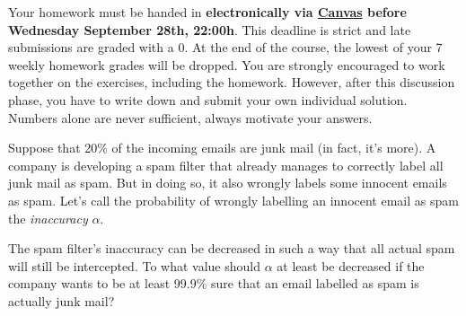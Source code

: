 \documentclass[a4paper,10pt,landscape,twocolumn]{scrartcl}
\newcommand\deadline{Wednesday September 28th, 22:00h}
\begin{document}
\homeworkproblems

{\sffamily\noindent
  Your homework must be handed in \textbf{electronically via
  \href{\canvasURL}{Canvas} before \deadline}. This deadline is strict and late
  submissions are graded with a 0. At the end of the course, the lowest of your
  7 weekly homework grades will be dropped. You are strongly encouraged to work
  together on the exercises, including the homework. However, after this
  discussion phase, you have to write down and submit your own individual
  solution. Numbers alone are never sufficient, always motivate your answers.
}


\begin{exercise}
  Suppose that 20\% of the incoming emails are junk mail (in fact, it's more).
  A company is developing a spam filter that already manages to correctly label
  all junk mail as spam. But in doing so, it also wrongly labels some innocent
  emails as spam. Let's call the probability of wrongly labelling an innocent
  email as spam the \emph{inaccuracy} $\alpha$.
  
  The spam filter's inaccuracy can be decreased in such a way that all actual
  spam will still be intercepted. To what value should $\alpha$ at least be
  decreased if the company wants to be at least 99.9\% sure that an email
  labelled as spam is actually junk mail?
\end{exercise}

\end{document}
